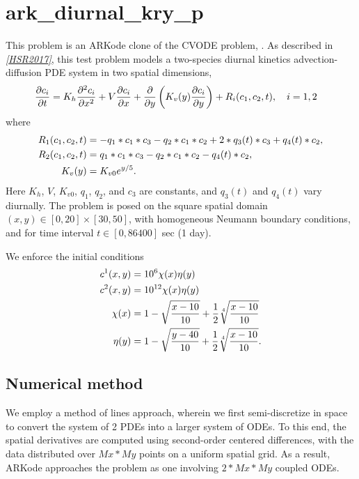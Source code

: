 \documentclass[letterpaper,10pt,english]{sphinxmanual}
\begin{document}
\section{ark\_diurnal\_kry\_p}
\label{c_parallel:id3}\label{c_parallel:ark-diurnal-kry-p}
This problem is an ARKode clone of the CVODE problem,
.  As described in \label{c_parallel:id4}{\hyperref[References:hsr2017]{\emph{{[}HSR2017{]}}}}, this test problem
models a two-species diurnal kinetics advection-diffusion PDE system
in two spatial dimensions,
\begin{gather}
\begin{split}\frac{\partial c_i}{\partial t} &=
  K_h \frac{\partial^2 c_i}{\partial x^2} +
  V \frac{\partial     c_i}{\partial x} +
  \frac{\partial}{\partial y}\left( K_v(y)
  \frac{\partial c_i}{\partial y}\right) +
  R_i(c_1,c_2,t),\quad i=1,2\end{split}\notag
\end{gather}
where
\begin{gather}
\begin{split}R_1(c_1,c_2,t) &= -q_1*c_1*c_3 - q_2*c_1*c_2 + 2*q_3(t)*c_3 + q_4(t)*c_2, \\
R_2(c_1,c_2,t) &=  q_1*c_1*c_3 - q_2*c_1*c_2 - q_4(t)*c_2, \\
K_v(y) &= K_{v0} e^{y/5}.\end{split}\notag
\end{gather}
Here \(K_h\), \(V\), \(K_{v0}\), \(q_1\), \(q_2\),
and \(c_3\) are constants, and \(q_3(t)\) and \(q_4(t)\)
vary diurnally.  The problem is posed on the square spatial domain
\((x,y) \in [0,20]\times[30,50]\), with homogeneous Neumann
boundary conditions, and for time interval \(t\in [0,86400]\) sec
(1 day).

We enforce the initial conditions
\begin{gather}
\begin{split}c^1(x,y) &=  10^6 \chi(x)\eta(y) \\
c^2(x,y) &=  10^{12} \chi(x)\eta(y) \\
\chi(x) &= 1 - \sqrt{\frac{x - 10}{10}} + \frac12 \sqrt[4]{\frac{x - 10}{10}} \\
\eta(y) &= 1 - \sqrt{\frac{y - 40}{10}} + \frac12 \sqrt[4]{\frac{x - 10}{10}}.\end{split}\notag
\end{gather}

\subsection{Numerical method}
\label{c_parallel:id5}
We employ a method of lines approach, wherein we first semi-discretize
in space to convert the system of 2 PDEs into a larger system of ODEs.
To this end, the spatial derivatives are computed using second-order
centered differences, with the data distributed over \(Mx*My\)
points on a uniform spatial grid.  As a result, ARKode approaches the
problem as one involving \(2*Mx*My\) coupled ODEs.
\end{document}
